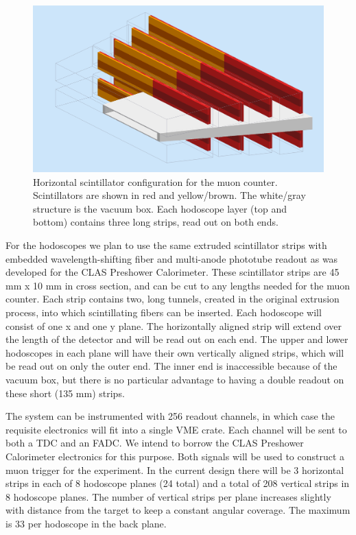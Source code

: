 
\begin{figure}[!ht]
\includegraphics[scale=0.22]{muon/Muon2b.png}
\caption{\small{Horizontal scintillator configuration for the muon counter. Scintillators are
shown in red and yellow/brown.  The white/gray structure is the vacuum box.  Each hodoscope layer (top
and bottom) contains three long strips, read out on both ends.
}}
\label{fig:Muon2p}
\end{figure}

For the hodoscopes we plan to use the same extruded scintillator strips with embedded wavelength-shifting fiber and multi-anode phototube readout as was developed for the CLAS Preshower Calorimeter. These scintillator strips are 45 mm x 10 mm in cross section, and can be cut to any lengths needed for the muon counter.  Each strip contains two, long tunnels, created in the original extrusion process, into which scintillating fibers can be inserted.  Each hodoscope will consist of one x and one y plane.  The horizontally aligned strip will extend over the length of the detector and will be read out on each end.  The upper and lower hodoscopes in each plane will have their own vertically aligned strips, which will be read out on only the outer end.  The inner end is inaccessible because of the vacuum box, but there is no particular advantage to having a double readout on these short (135 mm) strips.  

The system can be instrumented with 256 readout channels, in which case the requisite electronics will 
fit into a single VME crate.  Each channel
will be sent to both a TDC and an FADC.  We intend to borrow the CLAS Preshower Calorimeter electronics for this purpose.  Both signals will be used to construct a muon trigger for the experiment.  In the current design there will be 3 horizontal strips in each of 8 hodoscope planes (24 total) and a total of 208 vertical strips in 8 hodoscope planes.  The number of vertical strips per plane increases slightly with distance from the target to keep a constant angular coverage.  The maximum is 33 per hodoscope in the back plane.


